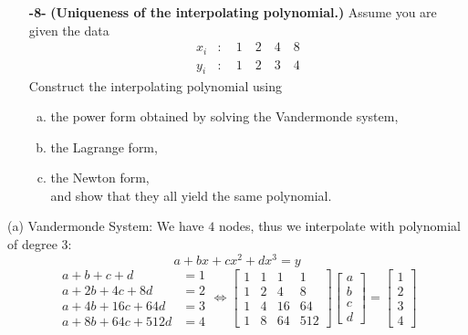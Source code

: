 \documentclass[11pt]{article}
\theoremstyle{definition}
\newcommand{\1}[1]{\mathbf{1} \left \{ #1 \right \}}
\begin{document}
\begin{itemize}
    \item[{\textbf{-8-}}] \textbf{(Uniqueness of the interpolating polynomial.)}  Assume you are given the data
    \begin{equation}
        \begin{split}
            x_i &:\quad 1\quad 2\quad 4\quad 8 \\
            y_i &:\quad 1\quad 2\quad 3\quad 4
        \end{split}
    \end{equation}
    Construct the interpolating polynomial using
    \begin{enumerate}[a.]
        \item the power form obtained by solving the Vandermonde system,
        \item the Lagrange form,
        \item the Newton form,\\
        and show that they all yield the same polynomial.
    \end{enumerate}
\end{itemize}
(a) Vandermonde System: We have $4$ nodes, thus we interpolate with polynomial of degree 3:
\[a + bx + cx^2 + dx^3 = y\]
\begin{equation*}
    \begin{split}
    a + b + c + d &= 1 \\
    a + 2b + 4c + 8d &= 2 \\
    a + 4b + 16c + 64d &= 3 \\
    a + 8b + 64c + 512d &= 4
    \end{split}
    \Longleftrightarrow \begin{bmatrix}
    1 & 1 & 1 & 1 \\
    1 & 2 & 4 & 8 \\
    1 & 4 & 16 & 64 \\
    1 & 8 & 64 & 512
    \end{bmatrix} \begin{bmatrix}
    a \\ b \\ c \\ d
    \end{bmatrix} = \begin{bmatrix}
    1 \\ 2 \\ 3 \\ 4 \end{bmatrix}
\end{equation*}
\end{document}

